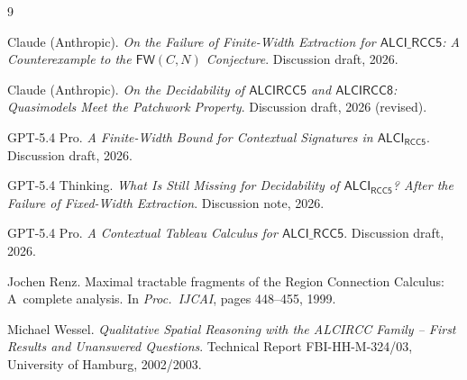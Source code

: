 \documentclass[11pt]{article}
\begin{document}
\begin{thebibliography}{9}

Claude (Anthropic).
\newblock \emph{On the Failure of Finite-Width Extraction for
  $\mathsf{ALCI\_RCC5}$: A Counterexample to the $\mathsf{FW}(C,N)$
  Conjecture}.
\newblock Discussion draft, 2026.

Claude (Anthropic).
\newblock \emph{On the Decidability of $\mathsf{ALCIRCC5}$ and
  $\mathsf{ALCIRCC8}$: Quasimodels Meet the Patchwork Property}.
\newblock Discussion draft, 2026 (revised).

GPT-5.4 Pro.
\newblock \emph{A Finite-Width Bound for Contextual Signatures in
  $\mathsf{ALCI}_{\mathsf{RCC5}}$}.
\newblock Discussion draft, 2026.

GPT-5.4 Thinking.
\newblock \emph{What Is Still Missing for Decidability of
  $\mathsf{ALCI}_{\mathsf{RCC5}}$? After the Failure of Fixed-Width
  Extraction}.
\newblock Discussion note, 2026.

GPT-5.4 Pro.
\newblock \emph{A Contextual Tableau Calculus for
  $\mathsf{ALCI\_RCC5}$}.
\newblock Discussion draft, 2026.

Jochen Renz.
\newblock Maximal tractable fragments of the Region Connection
  Calculus: A~complete analysis.
\newblock In \emph{Proc.\ IJCAI}, pages 448--455, 1999.

Michael Wessel.
\newblock \emph{Qualitative Spatial Reasoning with the ALCIRCC
  Family -- First Results and Unanswered Questions}.
\newblock Technical Report FBI-HH-M-324/03, University of Hamburg,
  2002/2003.

\end{thebibliography}
\end{document}
